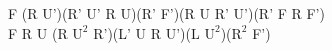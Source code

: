 F (R U')(R' U' R U)(R' F')(R U R' U')(R' F R F')\\
F R U (R $\text{U}^2$ R')(L' U R U')(L $\text{U}^2$)($\text{R}^2$ F')\\
